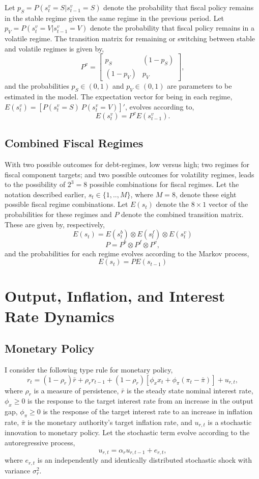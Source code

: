 \documentclass[11pt]{article}
\newcommand{\beq}{\begin{equation}}
\newcommand{\eeq}{\end{equation}}
\newcommand{\bdm}{\begin{displaymath}}
\newcommand{\edm}{\end{displaymath}}
\newcommand{\citee}[1]{\citet{#1}}
\begin{document}
Let $p_S = P(s_t^v = S | s_{t-1}^v = S)$ denote the probability that fiscal policy remains in the stable regime given the same regime in the previous period.  Let $p_V = P(s_t^v = V | s_{t-1}^v = V)$ denote the probability that fiscal policy remains in a volatile regime.  The transition matrix for remaining or switching between stable and volatile regimes is given by,
\beq P^v = \left[ \begin{array}{cc} p_S & (1-p_S) \\ (1-p_V) & p_V \end{array} \right], \eeq
and the probabilities  $p_S \in (0,1)$ and $p_V \in (0,1)$ are parameters to be estimated in the model. The expectation vector for being in each regime, $E(s_t^v) = [ P(s_t^v=S) ~ P(s_t^v=V)]'$, evolves according to,
\bdm E(s_t^v) = P^v E(s_{t-1}^v). \edm

\subsection{Combined Fiscal Regimes}

With two possible outcomes for debt-regimes, low versus high; two regimes for fiscal component targets; and two possible outcomes for volatility regimes, leads to the possibility of $2^3=8$ possible combinations for fiscal regimes.  Let the notation described earlier, $s_t \in \{1,..,M\}$, where $M=8$, denote these eight possible fiscal regime combinations.  Let $E(s_t)$ denote the $8\times 1$ vector of the probabilities for these regimes and $P$ denote the combined transition matrix.  These are given by, respectively,
\beq E(s_t) = E(s_t^b) \otimes E(s_t^f) \otimes E(s_t^v) \eeq
\beq P= P^b \otimes P^f \otimes P^v, \eeq
and the probabilities for each regime evolves according to the Markov process,
\beq E(s_t) = P E(s_{t-1}) \eeq

\section{Output, Inflation, and Interest Rate Dynamics}\label{s:model}
  
\subsection{Monetary Policy}

I consider the following \citee{taylor1993} type rule for monetary policy,
\beq \label{eq:taylor} r_t = (1-\rho_r) \bar{r} + \rho_r r_{t-1} + (1-\rho_r) \left[\phi_x x_t + \phi_\pi \left(\pi_t - \bar{\pi}\right) \right] + u_{r,t}, \eeq
where $\rho_r$ is a measure of persistence, $\bar{r}$ is the steady state nominal interest rate, $\phi_x \geq 0$ is the response to the target interest rate from an increase in the output gap, $\phi_\pi \geq 0$ is the response of the target interest rate to an increase in inflation rate, $\bar{\pi}$ is the monetary authority's target inflation rate, and $u_{r,t}$ is a stochastic innovation to monetary policy.  Let the stochastic term evolve according to the autoregressive process,
\beq \label{eq:mpshock} u_{r,t} = \alpha_r u_{r,t-1} + e_{r,t}, \eeq
where $e_{r,t}$ is an independently and identically distributed stochastic shock with variance $\sigma_r^2$.
\end{document}
